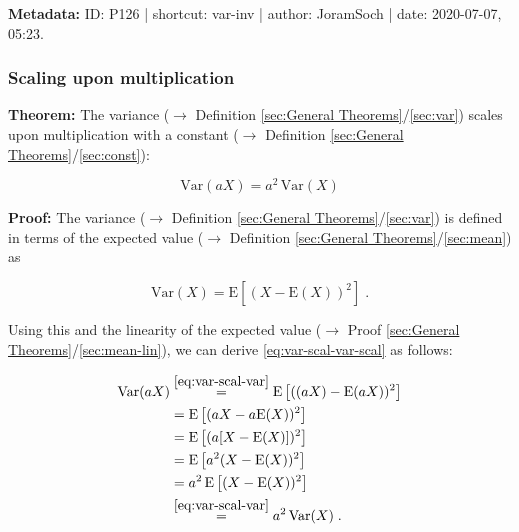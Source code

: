 \documentclass[a4paper,12pt,twoside]{book}
\begin{document}
\vspace{1em}
\textbf{Metadata:} ID: P126 | shortcut: var-inv | author: JoramSoch | date: 2020-07-07, 05:23.
\vspace{1em}



\subsubsection[\textbf{Scaling upon multiplication}]{Scaling upon multiplication} \label{sec:var-scal}
\setcounter{equation}{0}

\textbf{Theorem:} The variance ($\rightarrow$ Definition \ref{sec:General Theorems}/\ref{sec:var}) scales upon multiplication with a constant ($\rightarrow$ Definition \ref{sec:General Theorems}/\ref{sec:const}):

\begin{equation} \label{eq:var-scal-var-scal}
\mathrm{Var}(aX) = a^2 \, \mathrm{Var}(X)
\end{equation}


\vspace{1em}
\textbf{Proof:} The variance ($\rightarrow$ Definition \ref{sec:General Theorems}/\ref{sec:var}) is defined in terms of the expected value ($\rightarrow$ Definition \ref{sec:General Theorems}/\ref{sec:mean}) as

\begin{equation} \label{eq:var-scal-var}
\mathrm{Var}(X) = \mathrm{E}\left[ (X-\mathrm{E}(X))^2 \right] \; .
\end{equation}

Using this and the linearity of the expected value ($\rightarrow$ Proof \ref{sec:General Theorems}/\ref{sec:mean-lin}), we can derive \eqref{eq:var-scal-var-scal} as follows:

\begin{equation} \label{eq:var-scal-var-scal-qed}
\begin{split}
\mathrm{Var}(aX) &\overset{\eqref{eq:var-scal-var}}{=} \mathrm{E}\left[ ((aX)-\mathrm{E}(aX))^2 \right] \\
&= \mathrm{E}\left[ (aX - a\mathrm{E}(X))^2 \right] \\
&= \mathrm{E}\left[ (a [X - \mathrm{E}(X)])^2 \right] \\
&= \mathrm{E}\left[ a^2 (X - \mathrm{E}(X))^2 \right] \\
&= a^2 \, \mathrm{E}\left[ (X - \mathrm{E}(X))^2 \right] \\
&\overset{\eqref{eq:var-scal-var}}{=} a^2 \, \mathrm{Var}(X) \; . \\
\end{split}
\end{equation}
\end{document}

